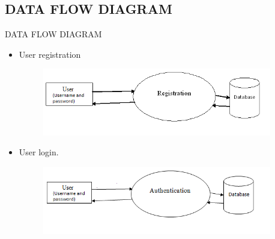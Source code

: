 \subsection{DATA FLOW DIAGRAM}
\begin{frame}{DATA FLOW DIAGRAM}
   \begin{itemize}
  \item User registration
  \begin{figure}[ht!]
    \centering
    \includegraphics[width=10cm]{login1.png}
    
    \label{fig:pc control reg}
\end{figure}

  \item User login.
   
   \begin{figure}[ht!]
    \centering
    \includegraphics[width=10cm]{login2.png}
    
    \label{fig:pc control login}
\end{figure}
 
\end{itemize}

 \end{frame}


